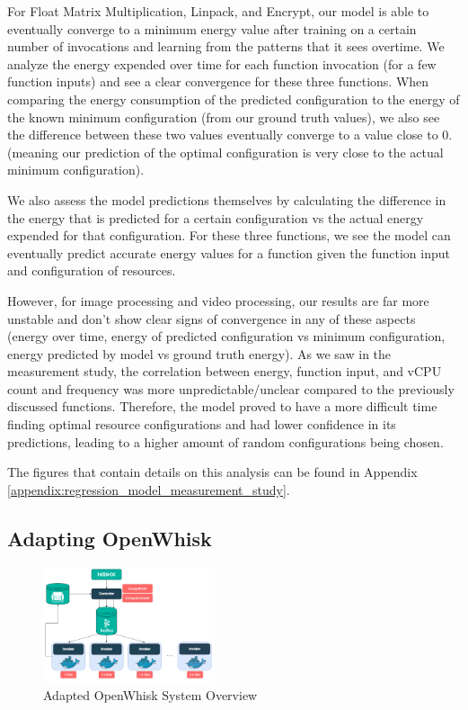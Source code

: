 \documentclass[times, 10pt,twocolumn]{article}
\begin{document}
For Float Matrix Multiplication, Linpack, and Encrypt, our model is able to eventually converge to a minimum energy value after training on a certain number of invocations and learning from the patterns that it sees overtime. We analyze the energy expended over time for each function invocation (for a few function inputs) and see a clear convergence for these three functions. When comparing the energy consumption of the predicted configuration to the energy of the known minimum configuration (from our ground truth values), we also see the difference between these two values eventually converge to a value close to 0. (meaning our prediction of the optimal configuration is very close to the actual minimum configuration). 

We also assess the model predictions themselves by calculating the difference in the energy that is predicted for a certain configuration vs the actual energy expended for that configuration. For these three functions, we see the model can eventually predict accurate energy values for a function given the function input and configuration of resources.

However, for image processing and video processing, our results are far more unstable and don't show clear signs of convergence in any of these aspects (energy over time, energy of predicted configuration vs minimum configuration, energy predicted by model vs ground truth energy). As we saw in the measurement study, the correlation between energy, function input, and vCPU count and frequency was more unpredictable/unclear compared to the previously discussed functions. Therefore, the model proved to have a more difficult time finding optimal resource configurations and had lower confidence in its predictions, leading to a higher amount of random configurations being chosen. 

The figures that contain details on this analysis can be found in Appendix \ref{appendix:regression_model_measurement_study}.


\subsection{Adapting OpenWhisk}

\begin{figure}[ht]
   \centering
   \includegraphics[width=0.45\textwidth]{imgs/Adapted_OW_System_Overview.png}
   \caption{Adapted OpenWhisk System Overview}
   \label{fig:adapted_ow_system_overview}
 \end{figure}
\end{document}
